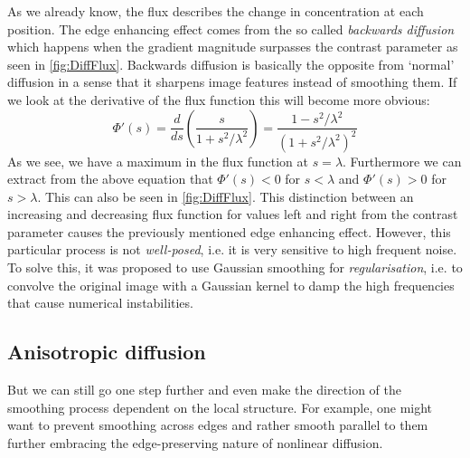 As we already know, the flux describes the change in concentration at each position. The edge
enhancing effect comes from the so called \textit{backwards diffusion} which happens when the
gradient magnitude surpasses the contrast parameter as seen in \ref{fig:DiffFlux}. Backwards
diffusion is basically the opposite from `normal' diffusion in a sense that it sharpens image
features instead of smoothing them.
If we look at the derivative of the flux function this will become more obvious:
\begin{equation}
    \Phi'(s) = \frac{d}{ds} \left(\frac{s}{1 + s^2/\lambda^2}\right) = 
    \frac{1 - s^2/\lambda^2}{\left(1 + s^2/\lambda^2\right)^2}
\end{equation}
As we see, we have a maximum in the flux function at $s = \lambda$. Furthermore we can extract from
the above equation that $\Phi'(s) < 0$ for $s < \lambda$ and $\Phi'(s) > 0$ for $s > \lambda$. This
can also be seen in \ref{fig:DiffFlux}. This distinction between an increasing and decreasing flux
function for values left and right from the contrast parameter causes the previously mentioned
edge enhancing effect.
However, this particular process is not \textit{well-posed}\cite{weickert96}, i.e. it is very
sensitive to high frequent noise. To solve this, it was proposed to use Gaussian smoothing for
\textit{regularisation}, i.e. to convolve the original image with a Gaussian kernel to damp the high
frequencies that cause numerical instabilities\cite{catte-lions-morel92}.

\subsection{Anisotropic diffusion}
But we can still go one step further and even make the direction of the smoothing process dependent
on the local structure. For example, one might want to prevent smoothing across edges and rather
smooth parallel to them further embracing the edge-preserving nature of nonlinear diffusion.


